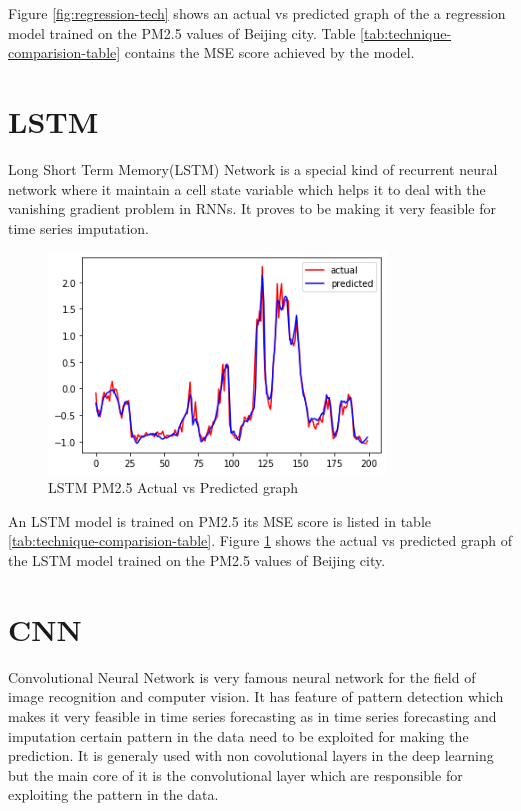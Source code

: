  Figure \ref{fig:regression-tech} shows an actual vs predicted graph of the a regression model trained on the PM2.5 values of Beijing city. Table \ref{tab:technique-comparision-table} contains the MSE score achieved by the model.

\section{LSTM}
Long Short Term Memory(LSTM) Network is a special kind of recurrent neural network where it maintain a cell state variable which helps it to deal with the vanishing gradient problem in RNNs. It proves to be making it very feasible for time series imputation.


\begin{figure}[ht]
	\centering
	\includegraphics[width=0.8\textwidth]{images/techniques/lstm.png}
	\caption{LSTM PM2.5 Actual vs Predicted graph}
	\label{fig:lstm-tech}
\end{figure}


An LSTM model is trained on PM2.5 its MSE score is listed in table \ref{tab:technique-comparision-table}. Figure \ref{fig:lstm-tech} shows the actual vs predicted graph of the LSTM model trained on the PM2.5 values of Beijing city.

\section{CNN}
Convolutional Neural Network is very famous neural network for the field of image recognition and computer vision. It has feature of pattern detection which makes it very feasible in time series forecasting as in time series forecasting and imputation certain pattern in the data need to be exploited for making the prediction. It is generaly used with non covolutional layers in the deep learning but the main core of it is the convolutional layer which are responsible for exploiting the pattern in the data.

